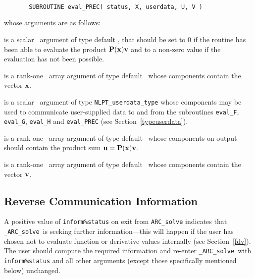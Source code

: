 \documentclass{galahad}
\newcommand{\packagename}{ARC}
\newcommand{\fullpackagename}{\libraryname\_\packagename}
\newcommand{\solver}{{\tt \fullpackagename\_solve}}
\begin{document}
\def\baselinestretch{0.8}
{\tt
\begin{verbatim}
       SUBROUTINE eval_PREC( status, X, userdata, U, V )
\end{verbatim} }
\def\baselinestretch{1.0}
\noindent whose arguments are as follows:

\begin{description}
 is a scalar \intentout\ argument of type default \integer,
that should be set to 0 if the routine has been able to evaluate the
product ${\mathbf{P}}({\mathbf{x}}) {\mathbf{v}}$
and to a non-zero value if the evaluation has not been possible.

 is a rank-one \intentin\ array argument of type default \realdp\
whose components contain the vector ${\mathbf{x}}$.

 is a scalar \intentinout\ argument of type
{\tt NLPT\_userdata\_type} whose components may be used
to communicate user-supplied data to and from the
subroutines {\tt eval\_F}, {\tt eval\_G},
{\tt eval\_H} and {\tt eval\_PREC}
(see Section~\ref{typeuserdata}).

 is a rank-one \intentout\ array argument of type default \realdp\
whose components on output should contain the product
sum ${\mathbf{u}} = {\mathbf{P}}({\mathbf{x}}) {\mathbf{v}}$.

 is a rank-one \intentin\ array argument of type default \realdp\
whose components contain the vector ${\mathbf{v}}$.

\end{description}


\subsection{\label{reverse}Reverse Communication Information}

A positive value of {\tt inform\%status} on exit from
{\tt \packagename\_solve}
indicates that
\solver\ is seeking further information---this will happen
if the user has chosen not to evaluate function or
derivative values internally (see Section~\ref{fdv}).
The user should compute the required information and re-enter \solver\
with {\tt inform\%status} and all other arguments (except those specifically
mentioned below) unchanged.
\end{document}
